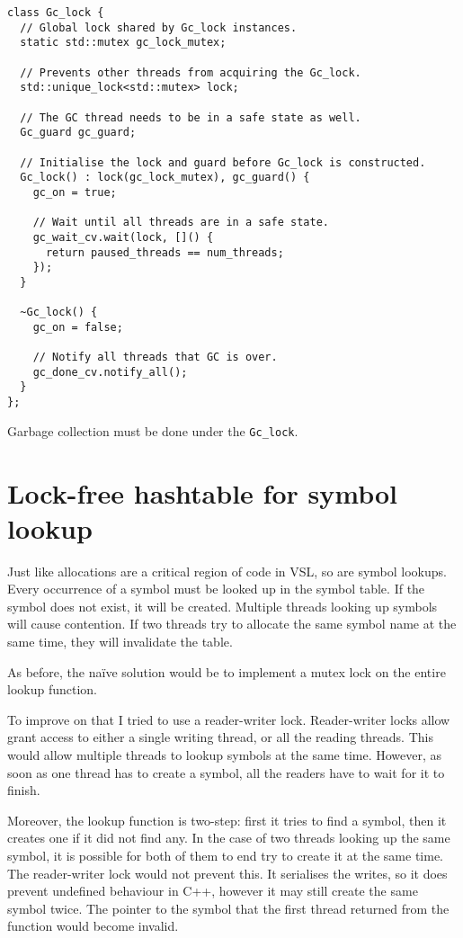\begin{code}
\begin{verbatim}
class Gc_lock {
  // Global lock shared by Gc_lock instances.
  static std::mutex gc_lock_mutex;

  // Prevents other threads from acquiring the Gc_lock.
  std::unique_lock<std::mutex> lock;

  // The GC thread needs to be in a safe state as well.
  Gc_guard gc_guard;

  // Initialise the lock and guard before Gc_lock is constructed.
  Gc_lock() : lock(gc_lock_mutex), gc_guard() {
    gc_on = true;

    // Wait until all threads are in a safe state.
    gc_wait_cv.wait(lock, []() {
      return paused_threads == num_threads;
    });
  }

  ~Gc_lock() {
    gc_on = false;

    // Notify all threads that GC is over.
    gc_done_cv.notify_all();
  }
};
\end{verbatim}
\caption{Garbage collection must be done under the \texttt{Gc\_lock}.}
\label{code:gc-lock}
\end{code}

\section{Lock-free hashtable for symbol lookup}
\label{sec:hashtable}
Just like allocations are a critical region of code in VSL, so are symbol lookups.
Every occurrence of a symbol must be looked up in the symbol table. If the symbol does
not exist, it will be created. Multiple threads looking up symbols will cause contention.
If two threads try to allocate the same symbol name at the same time, they will invalidate
the table.

As before, the na\"ive solution would be to implement a mutex lock on the entire
lookup function.

To improve on that I tried to use a reader-writer lock. Reader-writer locks allow grant access
to either a single writing thread, or all the reading threads. This would allow multiple
threads to lookup symbols at the same time. However, as soon as one thread has to create a
symbol, all the readers have to wait for it to finish.

Moreover, the lookup function is two-step: first it tries to find a symbol, then it creates one
if it did not find any. In the case of two threads looking up the same symbol, it is possible for
both of them to end try to create it at the same time. The reader-writer lock would not prevent this.
It serialises the writes, so it does prevent undefined behaviour in C++, however it may
still create the same symbol twice. The pointer to the symbol that the first thread returned from the function
would become invalid.

